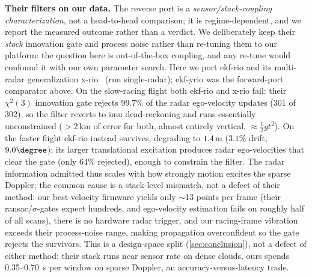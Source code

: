 \textbf{Their filters on our data.}  The reverse port is a
\emph{sensor/stack-coupling characterization}, not a head-to-head
comparison; it is regime-dependent, and we report the measured
outcome rather than a verdict.  We deliberately keep their \emph{stock}
innovation gate and process noise rather than re-tuning them to our
platform: the question here is out-of-the-box coupling, and any re-tune
would confound it with our own parameter search.  Here we port ekf-rio and
its multi-radar generalization
x-rio~\cite{doer2021xrio} (run single-radar); ekf-yrio was the
forward-port comparator above.  On the slow-racing flight both ekf-rio
and x-rio fail: their
$\chi^2(3)$ innovation gate rejects $99.7\%$ of the radar ego-velocity
updates (301 of 302), so the filter reverts to \ac{imu} dead-reckoning and
runs essentially unconstrained ($>2$\,km of error for both, almost
entirely vertical, $\approx\tfrac12 g t^2$).  On the faster flight ekf-rio
instead survives, degrading to $1.4$\,m ($3.1\%$ drift,
$9.0\degree$): its larger translational excitation produces radar
ego-velocities that clear the gate (only $64\%$ rejected), enough to
constrain the filter.  The radar information admitted thus
scales with how strongly motion excites the sparse Doppler; the common
cause is a stack-level mismatch, not a defect of their
method: our best-velocity firmware yields only $\sim$13 points per
frame (their \ac{ransac}/$\sigma$-gates expect hundreds, and ego-velocity
estimation fails on roughly half of all scans), there is no hardware radar
trigger, and our racing-frame vibration exceeds their process-noise range,
making propagation overconfident so the gate rejects the survivors.
This is a design-space split (\autoref{sec:conclusion}), not a defect of
either method: their stack runs near sensor rate on dense clouds, ours
spends \SI{0.35}{}--\SI{0.70}{\second} per window on sparse Doppler,
an accuracy-versus-latency trade.

